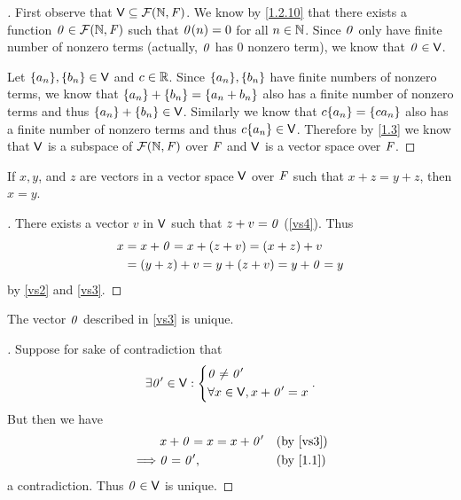 \begin{proof}[]
	First observe that \(\V \subseteq \fs{\N}{\F}\).
	We know by \cref{1.2.10} that there exists a function \(\zv \in \fs{\N}{\F}\) such that \(\mathit{0}(n) = 0\) for all \(n \in \mathbb{N}\).
	Since \(\mathit{0}\) only have finite number of nonzero terms (actually, \(\mathit{0}\) has \(0\) nonzero term), we know that \(\mathit{0} \in \mathsf{V}\).

	Let \(\B{a_n}, \B{b_n} \in \V\) and \(c \in \mathbb{R}\).
	Since \(\B{a_n}, \B{b_n}\) have finite numbers of nonzero terms, we know that \(\left\lbrace a_n\right\rbrace + \left\lbrace b_n\right\rbrace = \left\lbrace a_n + b_n\right\rbrace\) also has a finite number of nonzero terms and thus \(\left\lbrace a_n\right\rbrace + \left\lbrace b_n\right\rbrace \in \mathsf{V}\).
	Similarly we know that \(c\B{a_n} = \B{ca_n}\) also has a finite number of nonzero terms and thus \(c\B{a_n} \in \V\).
	Therefore by \cref{1.3} we know that \(\mathsf{V}\) is a subspace of \(\fs{\N}{\F}\) over \(\mathit{F}\) and \(\mathsf{V}\) is a vector space over \(\mathit{F}\).
\end{proof}

\begin{thm}\label{1.1}
	If \(x, y\), and \(z\) are vectors in a vector space \(\mathsf{V}\) over \(\mathit{F}\) such that \(x + z = y + z\), then \(x = y\).
\end{thm}

\begin{proof}[]
	There exists a vector \(v\) in \(\mathsf{V}\) such that \(z + v = \mathit{0}\) (\ref{vs4}).
	Thus
	\begin{align*}
		x & = x + \mathit{0} = x + (z + v) = (x + z) + v     \\
		  & = (y + z) + v = y + (z + v) = y + \mathit{0} = y
	\end{align*}
	by \ref{vs2} and \ref{vs3}.
\end{proof}

\begin{cor}\label{1.2.14}
	The vector \(\mathit{0}\) described in \ref{vs3} is unique.
\end{cor}

\begin{proof}[]
	Suppose for sake of contradiction that
	\[
		\exists \mathit{0}' \in \mathsf{V} : \begin{dcases}
			\mathit{0} \neq \mathit{0}' \\
			\forall x \in \mathsf{V}, x + \mathit{0}' = x
		\end{dcases}.
	\]
	But then we have
	\begin{align*}
		         & x + \zv = x = x + \zv' &  & \text{(by \ref{vs3})}  \\
		\implies & \zv = \zv',            &  & \text{(by \cref{1.1})}
	\end{align*}
	a contradiction.
	Thus \(\mathit{0} \in \mathsf{V}\) is unique.
\end{proof}

